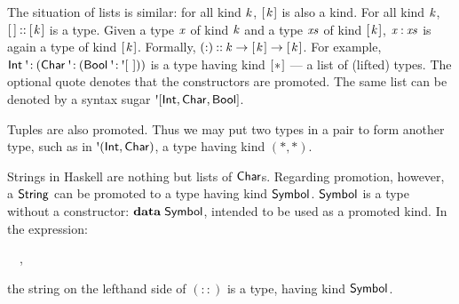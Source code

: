 The situation of lists is similar: for all kind \ensuremath{\Varid{k}}, \ensuremath{[\mskip1.5mu \Varid{k}\mskip1.5mu]} is also a kind. For
all kind \ensuremath{\Varid{k}}, \ensuremath{[\mskip1.5mu \mskip1.5mu]\mathbin{::}[\mskip1.5mu \Varid{k}\mskip1.5mu]} is a type. Given a type \ensuremath{\Varid{x}}
of kind \ensuremath{\Varid{k}} and a type \ensuremath{\Varid{xs}} of kind \ensuremath{[\mskip1.5mu \Varid{k}\mskip1.5mu]}, \ensuremath{\Varid{x}\mathbin{:}\Varid{xs}} is again a type of
kind \ensuremath{[\mskip1.5mu \Varid{k}\mskip1.5mu]}. Formally, \ensuremath{(\mathbin{:})\mathbin{::}\Varid{k}\to [\mskip1.5mu \Varid{k}\mskip1.5mu]\to [\mskip1.5mu \Varid{k}\mskip1.5mu]}. For example,
\ensuremath{\Conid{Int}\mathbin{\mbox{\textquotesingle}\!:}(\Conid{Char}\mathbin{\mbox{\textquotesingle}\!:}(\Conid{Bool}\mathbin{\mbox{\textquotesingle}\!:}\mbox{\textquotesingle}[~]))} is a type having kind \ensuremath{[\mskip1.5mu \mathbin{*}\mskip1.5mu]} --- a list of
(lifted) types. The optional quote denotes that the constructors are promoted.
The same list can be denoted by a syntax sugar \ensuremath{\mbox{\textquotesingle}[\Conid{Int},\Conid{Char},\Conid{Bool}]}.

Tuples are also promoted. Thus we may put two types in a pair to form another
type, such as in \ensuremath{\mbox{\textquotesingle}(\Conid{Int},\Conid{Char})}, a type having kind \ensuremath{(\mathbin{*},\mathbin{*})}.

Strings in Haskell are nothing but lists of \ensuremath{\Conid{Char}}s. Regarding promotion,
however, a \ensuremath{\Conid{String}} can be promoted to a type having kind \ensuremath{\Conid{Symbol}}. \ensuremath{\Conid{Symbol}} is
a type without a constructor: \ensuremath{\mathbf{data}\;\Conid{Symbol}},
intended to be used as a promoted kind. In the expression:
\begin{hscode}\SaveRestoreHook
{}%
%
\>[B]{}\mathbin{::}~~,{}\<[E]%
\ColumnHook
\end{hscode}\resethooks
the string on the lefthand side of \ensuremath{(\mathbin{::})} is a type, having kind \ensuremath{\Conid{Symbol}}.

